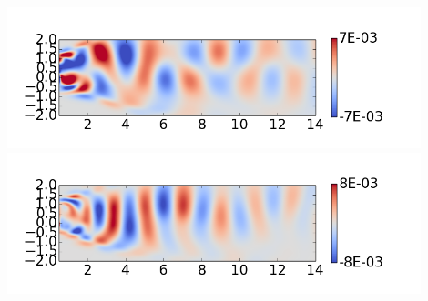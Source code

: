 \documentclass[9pt]{beamer}
\begin{document}
\begin{frame}
\begin{columns}[c]
    \includegraphics[width=0.9\textwidth]{PerturbRp95Re100POD2} \\
    \includegraphics[width=0.9\textwidth]{PerturbRp95Re100POD3}
\end{columns}
\end{frame}
\end{document}
